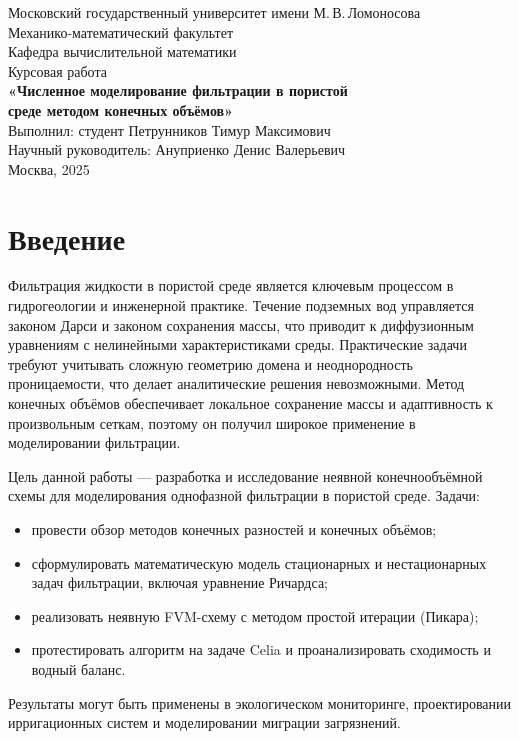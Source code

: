 \documentclass[a4paper,12pt]{article}
\begin{document}
\begin{titlepage}
  \centering
  {\large Московский государственный университет имени М.\,В.\,Ломоносова\\
  Механико-математический факультет\\
  Кафедра вычислительной математики}\\[2cm]

  {\LARGE Курсовая работа}\\[1cm]
  {\Large \textbf{«Численное моделирование фильтрации в пористой \\среде
  методом конечных объёмов»}}\\[1.5cm]

  {\large Выполнил: студент Петрунников Тимур Максимович\\
  Научный руководитель: Ануприенко Денис Валерьевич}\\[2cm]

  Москва, 2025
\end{titlepage}

\tableofcontents
\newpage

\section{Введение}
Фильтрация жидкости в пористой среде является ключевым процессом в гидрогеологии и инженерной практике. Течение подземных вод управляется законом Дарси и законом сохранения массы, что приводит к диффузионным уравнениям с нелинейными характеристиками среды. Практические задачи требуют учитывать сложную геометрию домена и неоднородность проницаемости, что делает аналитические решения невозможными. Метод конечных объёмов обеспечивает локальное сохранение массы и адаптивность к произвольным сеткам, поэтому он получил широкое применение в моделировании фильтрации.

Цель данной работы — разработка и исследование неявной конечнообъёмной схемы для моделирования однофазной фильтрации в пористой среде. Задачи:
\begin{itemize}
  \item провести обзор методов конечных разностей и конечных объёмов;
  \item сформулировать математическую модель стационарных и нестационарных задач фильтрации, включая уравнение Ричардса;
  \item реализовать неявную FVM-схему с методом простой итерации (Пикара);
  \item протестировать алгоритм на задаче Celia и проанализировать сходимость и водный баланс.
\end{itemize}
Результаты могут быть применены в экологическом мониторинге, проектировании ирригационных систем и моделировании миграции загрязнений.
\end{document}
